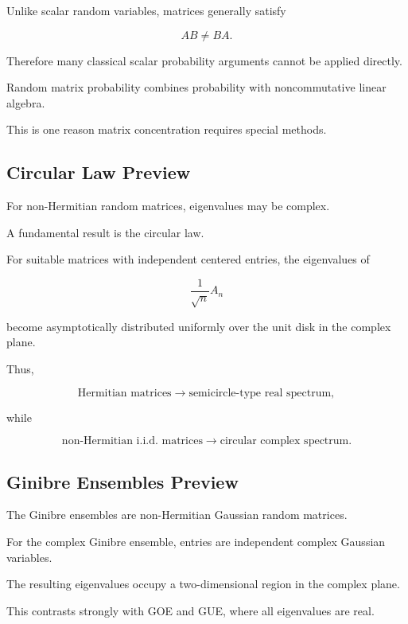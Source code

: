 Unlike scalar random variables, matrices generally satisfy

\[
\boxed{
AB\neq BA.
}
\]

Therefore many classical scalar probability arguments cannot be applied
directly.

Random matrix probability combines probability with noncommutative
linear algebra.

This is one reason matrix concentration requires special methods.

\subsection{Circular Law Preview}
\label{subsec:circular-law-preview}

For non-Hermitian random matrices, eigenvalues may be complex.

A fundamental result is the circular law.

For suitable matrices with independent centered entries, the eigenvalues
of

\[
\frac1{\sqrt{n}}A_n
\]

become asymptotically distributed uniformly over the unit disk in the
complex plane.

Thus,

\[
\boxed{
\text{Hermitian matrices}
\longrightarrow
\text{semicircle-type real spectrum},
}
\]

while

\[
\boxed{
\text{non-Hermitian i.i.d. matrices}
\longrightarrow
\text{circular complex spectrum}.
}
\]

\subsection{Ginibre Ensembles Preview}
\label{subsec:ginibre-ensembles}

The Ginibre ensembles are non-Hermitian Gaussian random matrices.

For the complex Ginibre ensemble, entries are independent complex
Gaussian variables.

The resulting eigenvalues occupy a two-dimensional region in the
complex plane.

This contrasts strongly with GOE and GUE, where all eigenvalues are
real.

